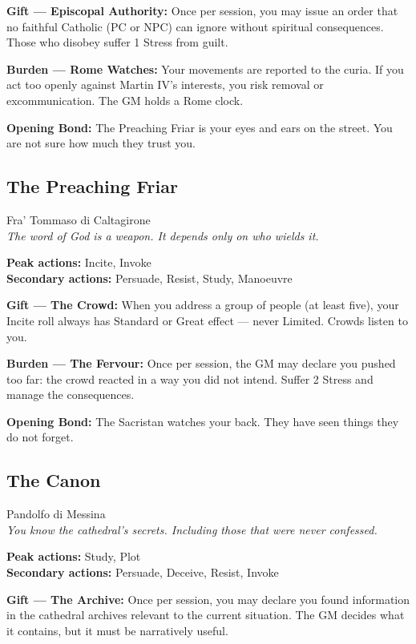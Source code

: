 \textbf{Gift --- Episcopal Authority:} Once per session, you may issue
an order that no faithful Catholic (PC or NPC) can ignore without
spiritual consequences. Those who disobey suffer 1 Stress from guilt.

\textbf{Burden --- Rome Watches:} Your movements are reported to the
curia. If you act too openly against Martin IV's interests, you risk
removal or excommunication. The GM holds a Rome clock.

\textbf{Opening Bond:} The Preaching Friar is your eyes and ears
on the street. You are not sure how much they trust you.

\filetto

\subsection{The Preaching Friar}
{\cinzel\footnotesize\color{grigionote} Fra' Tommaso di Caltagirone}\\
\textit{The word of God is a weapon. It depends only on who wields it.}

\textbf{Peak actions:} Incite, Invoke\\
\textbf{Secondary actions:} Persuade, Resist, Study, Manoeuvre

\textbf{Gift --- The Crowd:} When you address a group of people
(at least five), your Incite roll always has Standard or Great effect
— never Limited. Crowds listen to you.

\textbf{Burden --- The Fervour:} Once per session, the GM may declare
you pushed too far: the crowd reacted in a way you did not intend.
Suffer 2 Stress and manage the consequences.

\textbf{Opening Bond:} The Sacristan watches your back.
They have seen things they do not forget.

\filetto

\subsection{The Canon}
{\cinzel\footnotesize\color{grigionote} Pandolfo di Messina}\\
\textit{You know the cathedral's secrets. Including those that were never confessed.}

\textbf{Peak actions:} Study, Plot\\
\textbf{Secondary actions:} Persuade, Deceive, Resist, Invoke

\textbf{Gift --- The Archive:} Once per session, you may declare you
found information in the cathedral archives relevant to the current
situation. The GM decides what it contains, but it must be narratively
useful.

